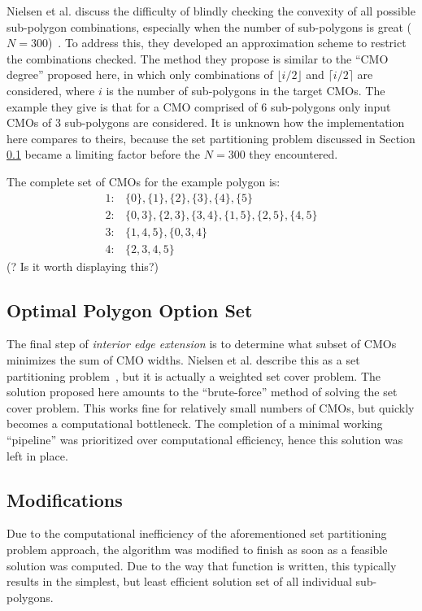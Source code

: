 Nielsen et al. discuss the difficulty of blindly checking the convexity of all possible sub-polygon combinations, especially when the number of sub-polygons is great ($N=300$)~\cite{IntEdgeExt}.
To address this, they developed an approximation scheme to restrict the combinations checked.
The method they propose is similar to the ``CMO degree'' proposed here, in which only combinations of $\lfloor i/2 \rfloor$ and $\lceil i/2 \rceil$ are considered, where $i$ is the number of sub-polygons in the target CMOs.
The example they give is that for a CMO comprised of 6 sub-polygons only input CMOs of 3 sub-polygons are considered.
It is unknown how the implementation here compares to theirs, because the set partitioning problem discussed in Section \ref{OptimalCMOs} became a limiting factor before the $N=300$ they encountered.

The complete set of CMOs for the example polygon is:
\[
\begin{split}
	1:& \{0\},\{1\},\{2\},\{3\},\{4\},\{5\}\\
	2:& \{0,3\},\{2,3\},\{3,4\},\{1,5\},\{2,5\},\{4,5\}\\
	3:& \{1,4,5\},\{0,3,4\}\\
	4:& \{2,3,4,5\}
\end{split}
\]
(? Is it worth displaying this?)

\subsection{Optimal Polygon Option Set}\label{OptimalCMOs}
The final step of \textit{interior edge extension} is to determine what subset of CMOs minimizes the sum of CMO widths.
Nielsen et al. describe this as a set partitioning problem~\cite{IntEdgeExt}, but it is actually a weighted set cover problem.
The solution proposed here amounts to the ``brute-force'' method of solving the set cover problem.
This works fine for relatively small numbers of CMOs, but quickly becomes a computational bottleneck.
The completion of a minimal working ``pipeline'' was prioritized over computational efficiency, hence this solution was left in place.

\subsection{Modifications}
Due to the computational inefficiency of the aforementioned set partitioning problem approach, the algorithm was modified to finish as soon as a feasible solution was computed.
Due to the way that function is written, this typically results in the simplest, but least efficient solution set of all individual sub-polygons.

